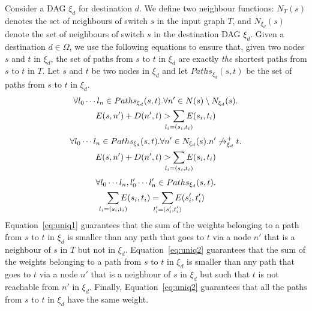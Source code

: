 Consider a DAG $\xi_d$ for destination $d$. We define two neighbour
functions: $N_T(s)$ denotes the set of neighbours of switch $s$ 
in the input graph $T$, and $N_{\xi_d}(s)$ denote the set of
neighbours of switch $s$ in the destination DAG $\xi_d$. 
Given a destination $d\in \Omega$,
we use the following equations to ensure that, given two nodes $s$ and $t$ in
$\xi_d$, 
the set of paths from $s$ to $t$ in $\xi_d$ are
exactly
\emph{the} shortest paths from $s$ to $t$ in $T$.
Let $s$ and $t$ be two nodes in $\xi_d$ and let  $Paths_{\xi_d}(s,t)$ be the set of paths from $s$ to $t$ in $\xi_d$.
\begin{multline} \label{eq:uniq1}
		\forall l_0\cdots l_n\in Paths_{\xi_d}(s,t).
		\forall n' \in N(s) \setminus N_{\xi_d}(s). \\
		E(s, n') + D(n', t) > \sum_{\mathclap{\substack{l_i=(s_i,t_i)}}} 
		E(s_i, t_i) 
\end{multline}
\begin{multline} \label{eq:uniq2}
		\forall l_0\cdots l_n\in Paths_{\xi_d}(s,t).
		\forall n' \in N_{\xi_d}(s). n' \not\rightarrow^+_{\xi_d} t.  \\
		E(s, n') + D(n', t) > \sum_{\mathclap{\substack{l_i=(s_i,t_i)}}} 
		E(s_i, t_i) 
\end{multline}
\begin{multline} \label{eq:uniq3}
		\forall l_0\cdots l_n, l_0'\cdots l_n'\in Paths_{\xi_d}(s,t).\\
		\sum_{\mathclap{\substack{l_i=(s_i,t_i)}}} 
		E(s_i, t_i)  =\sum_{\mathclap{\substack{l_i'=(s_i',t_i')}}} 
		E(s_i', t_i') 
\end{multline}
Equation~\ref{eq:uniq1} guarantees that 
the sum of the weights belonging to a path from $s$ to $t$ in $\xi_d$ is smaller than 
any path that goes to $t$ via a node $n'$ that is a neighbour of $s$ in $T$ but not in $\xi_d$.
Equation~\ref{eq:uniq2} guarantees that
the sum of the weights belonging to a path from $s$ to $t$ in $\xi_d$ is smaller than 
any path that goes to $t$ via a node $n'$ that is a neighbour of $s$ in $\xi_d$ but such that
$t$ is not reachable from $n'$ in $\xi_d$.
Finally, Equation~\ref{eq:uniq2} guarantees that all the paths from $s$ to $t$ in $\xi_d$ have the same weight.
